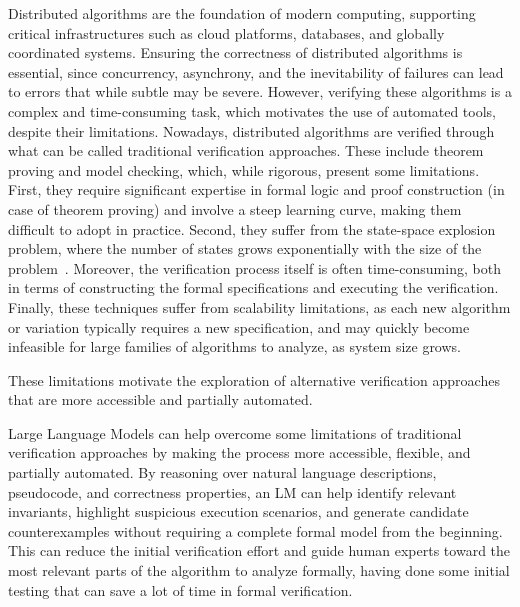 \label{chap:intro}
\noindent Distributed algorithms are the foundation of modern computing, supporting critical infrastructures such as cloud platforms, databases, and globally coordinated systems. Ensuring the correctness of distributed algorithms is essential, since concurrency, asynchrony\cite{lamport1978distributed, lamport1982byzantine}, and the inevitability of failures can lead to errors that while subtle may be severe. However, verifying these algorithms is a complex and time-consuming task, which motivates the use of automated tools, despite their limitations. Nowadays, distributed algorithms are verified through what can be called traditional verification approaches. These include theorem proving and model checking, which, while rigorous, present some limitations. First, they require significant expertise in formal logic and proof construction (in case of theorem proving)\cite{paulson1989isabelle, lynch1996distributed} and involve a steep learning curve, making them difficult to adopt in practice. Second, they suffer from the state-space explosion problem, where the number of states grows exponentially with the size of the problem~\cite{baier2008principles}. Moreover, the verification process itself is often time-consuming, both in terms of constructing the formal specifications and executing the verification. Finally, these techniques suffer from scalability limitations, as each new algorithm or variation typically requires a new specification, and may quickly become infeasible for large families of algorithms to analyze, as system size grows. 

These limitations motivate the exploration of alternative verification approaches that are more accessible and partially automated. 

Large Language Models can help overcome some limitations of traditional verification approaches by making the process more accessible, flexible, and partially automated. 
By reasoning over natural language descriptions, pseudocode, and correctness properties, an LM can help identify relevant invariants, highlight suspicious execution scenarios, and generate candidate counterexamples without requiring a complete formal model from the beginning. This can reduce the initial verification effort and guide human experts toward the most relevant parts of the algorithm to analyze formally, having done some initial testing that can save a lot of time in formal verification.

